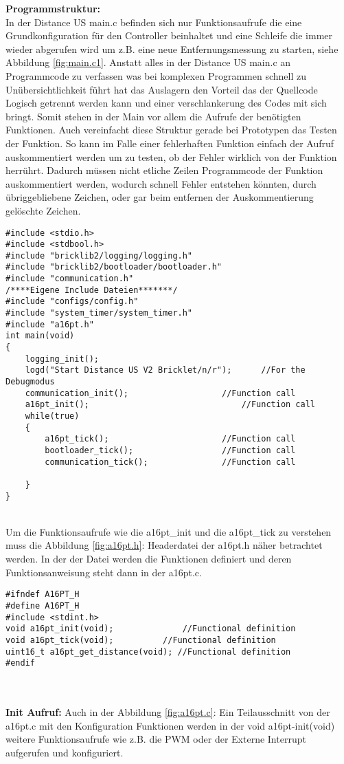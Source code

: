 \textbf{Programmstruktur:}\\
In der  Distance US main.c befinden sich nur Funktionsaufrufe die eine Grundkonfiguration  für den Controller beinhaltet und eine Schleife die immer wieder abgerufen wird um z.B. eine neue Entfernungsmessung zu starten, siehe Abbildung \ref{fig:main.c1}. Anstatt alles in der Distance US main.c an Programmcode zu verfassen was bei  komplexen Programmen schnell zu Unübersichtlichkeit führt hat das Auslagern den Vorteil das der Quellcode Logisch getrennt werden kann und einer verschlankerung des Codes mit sich bringt. 
Somit stehen in der Main  vor allem die Aufrufe der benötigten Funktionen. 
Auch vereinfacht diese Struktur gerade bei Prototypen das Testen der Funktion. So kann im Falle einer fehlerhaften Funktion einfach der Aufruf auskommentiert werden um zu testen, ob der Fehler wirklich von der Funktion herrührt. Dadurch müssen nicht etliche Zeilen Programmcode der Funktion auskommentiert werden, wodurch schnell Fehler entstehen könnten, durch übriggebliebene Zeichen, oder gar beim entfernen der Auskommentierung gelöschte Zeichen.\\
\begin{minipage}{1\textwidth}
\begin{lstlisting}
#include <stdio.h>
#include <stdbool.h>
#include "bricklib2/logging/logging.h"
#include "bricklib2/bootloader/bootloader.h"
#include "communication.h"
/****Eigene Include Dateien*******/
#include "configs/config.h"
#include "system_timer/system_timer.h"
#include "a16pt.h"
int main(void)
{ 
	logging_init(); 
	logd("Start Distance US V2 Bricklet/n/r");  	//For the Debugmodus
	communication_init(); 					//Function call
	a16pt_init(); 								//Function call	
	while(true)
	{
		a16pt_tick(); 						//Function call
		bootloader_tick(); 					//Function call
		communication_tick(); 				//Function call
		
	}
}
\end{lstlisting}
\label{fig:main.c1}
\end{minipage}\\
Um die Funktionsaufrufe wie die a16pt\_init und die a16pt\_tick zu verstehen muss die Abbildung \ref{fig:a16pt.h}: Headerdatei der a16pt.h näher betrachtet werden.
In der der Datei werden die Funktionen definiert und deren Funktionsanweisung steht dann in der a16pt.c.\\
\begin{minipage}{1\textwidth}
\begin{lstlisting}
#ifndef A16PT_H
#define A16PT_H
#include <stdint.h>
void a16pt_init(void);				//Functional definition
void a16pt_tick(void); 			//Functional definition
uint16_t a16pt_get_distance(void); //Functional definition
#endif
\end{lstlisting}
\label{fig:a16pt.h}
\end{minipage}\\
\\
\textbf{Init Aufruf:}
Auch in der Abbildung \ref{fig:a16pt.c}: Ein Teilausschnitt von der a16pt.c mit den Konfiguration Funktionen werden in der void a16pt-init(void)  weitere Funktionsaufrufe wie z.B. die PWM oder der Externe Interrupt aufgerufen und konfiguriert.


